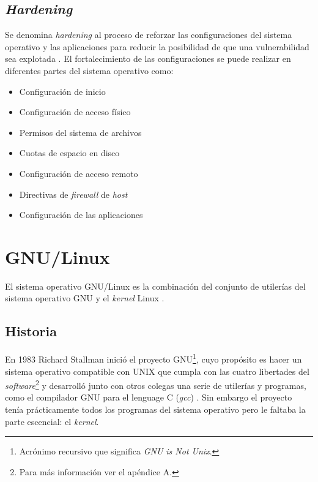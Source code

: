   \subsection {\textit{Hardening}}

Se denomina \textit{hardening} al proceso de reforzar las configuraciones del sistema operativo y las aplicaciones para reducir la posibilidad de que una vulnerabilidad sea explotada \cite{padilla_buenas_2009}. El fortalecimiento de las configuraciones se puede realizar en diferentes partes del sistema operativo como:

\begin{itemize}
  \item Configuraci\'{o}n de inicio
  \item Configuraci\'{o}n de acceso f\'{i}sico
  \item Permisos del sistema de archivos
  \item Cuotas de espacio en disco
  \item Configuraci\'{o}n de acceso remoto
  \item Directivas de \textit{firewall} de \textit{host}
  \item Configuraci\'{o}n de las aplicaciones
\end{itemize}

\newpage
\section {\textsc{GNU}/Linux}

El sistema operativo GNU/Linux es la combinaci\'{o}n del conjunto de utiler\'{i}as del sistema operativo GNU y el \textit{kernel} Linux \cite{_linux_????}.


  \subsection {Historia}

En 1983 Richard Stallman inici\'{o} el proyecto \textsc{GNU}\footnote{Acr\'{o}nimo recursivo que significa \emph{GNU is Not Unix}.}, cuyo prop\'{o}sito es hacer un sistema operativo compatible con \textsc{UNIX} que cumpla con las cuatro libertades del \textit{software}\footnote{Para m\'{a}s informaci\'{o}n ver el ap\'{e}ndice A.} y desarroll\'{o} junto con otros colegas una serie de utiler\'{i}as y programas, como el compilador \textsc{GNU} para el lenguage \textsc{C} (\textit{gcc}) \cite{_about_????}. Sin embargo el proyecto ten\'{i}a pr\'{a}cticamente todos los programas del sistema operativo pero le faltaba la parte escencial: el \textit{kernel}.

